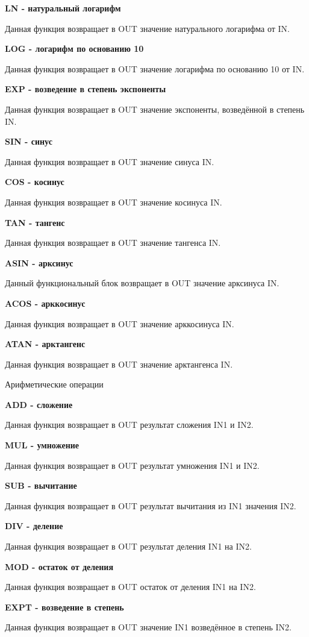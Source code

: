 \documentclass[letterpaper,10pt,russian]{sphinxmanual}
\begin{document}
\textbf{LN - натуральный логарифм}

Данная функция возвращает в OUT значение натурального логарифма от IN.

\textbf{LOG - логарифм по основанию 10}

Данная функция возвращает в OUT значение логарифма по основанию 10 от
IN.

\textbf{EXP - возведение в степень экспоненты}

Данная функция возвращает в OUT значение экспоненты, возведённой в
степень IN.

\textbf{SIN - синус}

Данная функция возвращает в OUT значение синуса IN.

\textbf{COS - косинус}

Данная функция возвращает в OUT значение косинуса IN.

\textbf{TAN - тангенс}

Данная функция возвращает в OUT значение тангенса IN.

\textbf{ASIN - арксинус}

Данный функциональный блок возвращает в OUT значение арксинуса IN.

\textbf{ACOS - арккосинус}

Данная функция возвращает в OUT значение арккосинуса IN.

\textbf{ATAN - арктангенс}

Данная функция возвращает в OUT значение арктангенса IN.

Арифметические операции

\textbf{ADD - сложение}

Данная функция возвращает в OUT результат сложения IN1 и IN2.

\textbf{MUL - умножение}

Данная функция возвращает в OUT результат умножения IN1 и IN2.

\textbf{SUB - вычитание}

Данная функция возвращает в OUT результат вычитания из IN1 значения IN2.

\textbf{DIV - деление}

Данная функция возвращает в OUT результат деления IN1 на IN2.

\textbf{MOD - остаток от деления}

Данная функция возвращает в OUT остаток от деления IN1 на IN2.

\textbf{EXPT - возведение в степень}

Данная функция возвращает в OUT значение IN1 возведённое в степень IN2.
\end{document}
